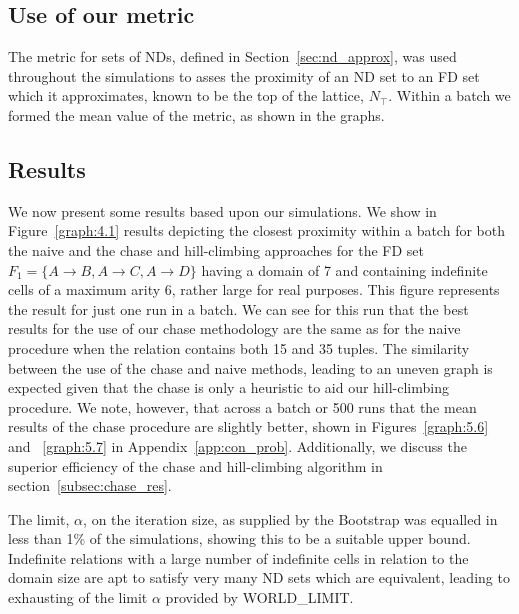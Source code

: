 \subsection{Use of our metric}\label{subsec:cp_metric_use}
The metric for sets of NDs, defined in Section~\ref{sec:nd_approx},
was used throughout the simulations to asses the proximity of an ND
set to an FD set which it approximates, known to be the top of the
lattice, $N_{\top}$. Within a batch we formed the mean value of the
metric, as shown in the graphs.   

\subsection{Results}\label{sol:res}

We now present some results based upon our simulations. We show
in Figure~\ref{graph:4.1} results depicting the closest proximity
within a batch for 
both the naive and the chase and hill-climbing approaches for the
FD set $F_1 = \{A \to B, A \to C, A \to D \}$ having a domain of 7 and 
containing indefinite cells of a maximum arity 6, rather large for
real purposes. This figure represents the result for just one run in a
batch. We can see for this run that the best results for the use of 
our chase methodology are the same as for the naive procedure when the
relation contains both 15 and 35 tuples. The similarity between the use
of the chase and naive methods, leading to an uneven graph is expected
given that the chase is 
only a heuristic to aid our hill-climbing procedure. We note, however,
that across a batch or 500 runs that the mean results of the chase
procedure are slightly better, shown in Figures~\ref{graph:5.6} and
~\ref{graph:5.7} in Appendix~\ref{app:con_prob}. Additionally, we
discuss the superior efficiency of the chase and hill-climbing
algorithm in section~\ref{subsec:chase_res}.

\medskip

The limit, $\alpha$,  
on the iteration size, as supplied by the Bootstrap was 
equalled in less than 1\% of the simulations, showing this to
be a suitable upper bound. Indefinite relations with a large number of
indefinite cells in relation to the domain size are apt to satisfy
very many ND sets which are equivalent, leading to exhausting of the
limit $\alpha$ provided by WORLD\_LIMIT.

